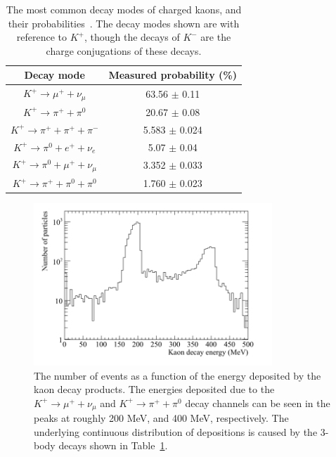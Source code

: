 \begin{table}
  \caption[The most common decay modes of charged kaons, and their probabilities]
          {The most common decay modes of charged kaons, and their probabilities~\citep{PDGReview}. The decay modes shown are with reference to $K^{+}$, though the decays of $K^{-}$ are the charge conjugations of these decays.}
  \centering
  \label{tab:NDK_KaonDecayRat}
  \begin{tabular}{c c}
    \toprule
        {Decay mode}                                      & {Measured probability (\%)} \\
        \midrule
        $K^{+} \rightarrow \mu^{+} + \nu_{\mu}$           & 63.56 $\pm$ 0.11 \\

        $K^{+} \rightarrow \pi^{+} + \pi^{0}$             & 20.67 $\pm$ 0.08 \\

        $K^{+} \rightarrow \pi^{+} + \pi^{+} + \pi^{-}$   & 5.583 $\pm$ 0.024 \\

        $K^{+} \rightarrow \pi^{0} + e^{+} + \nu_{e}$     & 5.07 $\pm$ 0.04 \\

        $K^{+} \rightarrow \pi^{0} + \mu^{+} + \nu_{\mu}$ & 3.352 $\pm$ 0.033 \\

        $K^{+} \rightarrow \pi^{+} + \pi^{0} + \pi^{0}$   & 1.760 $\pm$ 0.023 \\
        \bottomrule
  \end{tabular}
\end{table}

\begin{figure}
  \centering
  \includegraphics[width=0.8\textwidth]{NucleonDecay_KaonDecayEnergy}
  \caption[The number of events as a function of the energy deposited by the kaon decay products.]
          {The number of events as a function of the energy deposited by the kaon decay products. The energies deposited due to the $K^{+} \rightarrow \mu^{+} + \nu_{\mu}$ and $K^{+} \rightarrow \pi^{+} + \pi^{0}$ decay channels can be seen in the peaks at roughly 200 MeV, and 400 MeV, respectively. The underlying continuous distribution of depositions is caused by the 3-body decays shown in Table~\ref{tab:NDK_KaonDecayRat}.}
  \label{fig:NDK_KaonDecayEn}
\end{figure}


